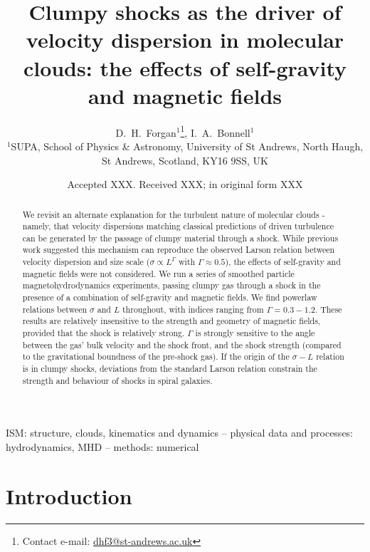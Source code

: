 \documentclass[a4paper,fleqn,usenatbib]{mnras}
\title[The velocity dispersion in molecular clouds]{Clumpy shocks as the driver of velocity dispersion in molecular clouds: the effects of self-gravity and magnetic fields}
\author[D. H. Forgan and I.A. Bonnell]
{D.~H.~Forgan$^1$\thanks{Contact e-mail: \href{mailto:dhf3@st-andrews.ac.uk}{dhf3@st-andrews.ac.uk}},
I.~A.~Bonnell$^1$
\vspace{0.2cm} \\
$^{1}$SUPA, School of Physics \& Astronomy, University of St Andrews, North Haugh, St Andrews, Scotland, KY16 9SS, UK}
\date{Accepted XXX. Received XXX; in original form XXX}
\begin{document}
\label{firstpage}
\pagerange{\pageref{firstpage}--\pageref{lastpage}}
\maketitle

\begin{abstract}

\noindent We revisit an alternate explanation for the turbulent nature of molecular clouds - namely, that velocity dispersions matching classical predictions of driven turbulence can be generated by the passage of clumpy material through a shock.  While previous work suggested this mechanism can reproduce the observed Larson relation between velocity dispersion and size scale ($\sigma \propto L^{\Gamma}$ with $\Gamma \approx 0.5$), the effects of self-gravity and magnetic fields were not considered.  We run a series of smoothed particle magnetohydrodynamics experiments, passing clumpy gas through a shock in the presence of a combination of self-gravity and magnetic fields.  We find powerlaw relations between $\sigma$ and $L$ throughout, with indices ranging from $\Gamma=0.3-1.2$.  These results are relatively insensitive to the strength and geometry of magnetic fields, provided that the shock is relatively strong.  $\Gamma$ is strongly sensitive to the angle between the gas' bulk velocity and the shock front, and the shock strength (compared to the gravitational boundness of the pre-shock gas).  If the origin of the $\sigma-L$ relation is in clumpy shocks, deviations from the standard Larson relation constrain the strength and behaviour of shocks in spiral galaxies.  


\end{abstract}

\begin{keywords}

ISM: structure, clouds, kinematics and dynamics -- physical data and processes: hydrodynamics, MHD -- methods: numerical
\end{keywords}



\section{Introduction}
\label{sec:introduction}
\end{document}
